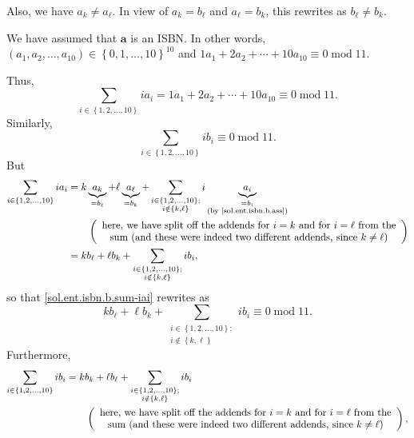 \documentclass[paper=a4, fontsize=12pt]{scrartcl}%
\let\sumnonlimits\sum
\renewcommand{\sum}{\sumnonlimits\limits}
\theoremstyle{plainsl}
\theoremstyle{definition}
\theoremstyle{remark}
\begin{document}
Also, we have $a_{k}\neq a_{\ell}$. In view of $a_{k}=b_{\ell}$ and $a_{\ell
}=b_{k}$, this rewrites as $b_{\ell}\neq b_{k}$.

We have assumed that $\mathbf{a}$ is an ISBN. In other words, $\left(
a_{1},a_{2},\ldots,a_{10}\right)  \in\left\{  0,1,\ldots,10\right\}  ^{10}$
and $1a_{1}+2a_{2}+\cdots+10a_{10}\equiv0\operatorname{mod}11$.

Thus,%
\begin{equation}
\sum_{i\in\left\{  1,2,\ldots,10\right\}  }ia_{i}=1a_{1}+2a_{2}+\cdots
+10a_{10}\equiv0\operatorname{mod}11. \label{sol.ent.isbn.b.sum-iai}%
\end{equation}
Similarly,%
\begin{equation}
\sum_{i\in\left\{  1,2,\ldots,10\right\}  }ib_{i}\equiv0\operatorname{mod}11.
\label{sol.ent.isbn.b.sum-ibi}%
\end{equation}
But%
\begin{align*}
\sum_{i\in\left\{  1,2,\ldots,10\right\}  }ia_{i}  &  =k\underbrace{a_{k}%
}_{=b_{\ell}}+\ell\underbrace{a_{\ell}}_{=b_{k}}+\sum_{\substack{i\in\left\{
1,2,\ldots,10\right\}  ;\\i\notin\left\{  k,\ell\right\}  }}i\underbrace{a_{i}%
}_{\substack{=b_{i}\\\text{(by \eqref{sol.ent.isbn.b.ass})}}}\\
&  \qquad\left(
\begin{array}
[c]{c}%
\text{here, we have split off the addends for }i=k\text{ and for }i=\ell\text{
from the}\\
\text{sum (and these were indeed two different addends, since }k\neq
\ell\text{)}%
\end{array}
\right) \\
&  =kb_{\ell}+\ell b_{k}+\sum_{\substack{i\in\left\{  1,2,\ldots,10\right\}
;\\i\notin\left\{  k,\ell\right\}  }}ib_{i},
\end{align*}
so that \eqref{sol.ent.isbn.b.sum-iai} rewrites as%
\begin{equation}
kb_{\ell}+\ell b_{k}+\sum_{\substack{i\in\left\{  1,2,\ldots,10\right\}
;\\i\notin\left\{  k,\ell\right\}  }}ib_{i}\equiv0\operatorname{mod}11.
\label{sol.ent.isbn.b.sum-iai2}%
\end{equation}
Furthermore,%
\begin{align*}
\sum_{i\in\left\{  1,2,\ldots,10\right\}  }ib_{i}  &  =kb_{k}+\ell b_{\ell
}+\sum_{\substack{i\in\left\{  1,2,\ldots,10\right\}  ;\\i\notin\left\{
k,\ell\right\}  }}ib_{i}\\
&  \qquad\left(
\begin{array}
[c]{c}%
\text{here, we have split off the addends for }i=k\text{ and for }i=\ell\text{
from the}\\
\text{sum (and these were indeed two different addends, since }k\neq
\ell\text{)}%
\end{array}
\right)  ,
\end{align*}
\end{document}
